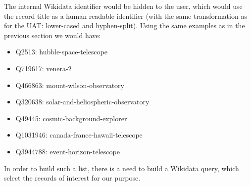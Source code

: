 \documentclass[11pt,a4paper]{ivoa}
\begin{document}
The internal Wikidata identifier would be hidden to the user, which
would use the record title as a human readable identifier (with the
same transformation as for the UAT: lower-cased and hyphen-split).
Using the same examples as in the previous section we would have:
\begin{itemize}
\item Q2513: hubble-space-telescope
\item Q719617: venera-2
\item Q466863: mount-wilson-observatory
\item Q320638: solar-and-heliospheric-observatory
\item Q49445: cosmic-background-explorer
\item Q1031946: canada-france-hawaii-telescope
\item Q3944788: event-horizon-telescope
\end{itemize}
In order to build such a list, there is a need to build a Wikidata
query, which select the records of interest for our purpose.
\end{document}
